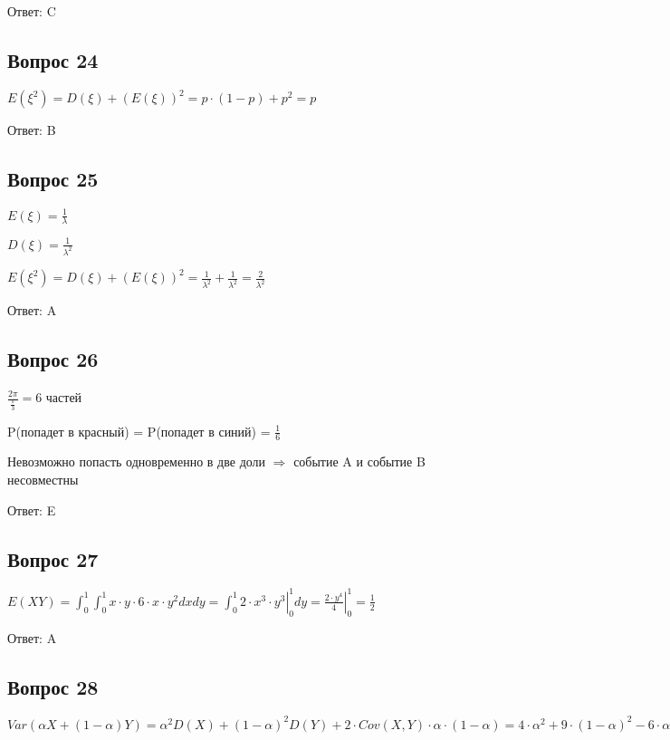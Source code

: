 \documentclass{article}
\begin{document}
\begin{flushleft}
Ответ: C

\subsection{Вопрос 24}

$E(\xi^2) = D(\xi) + (E(\xi))^2 = p\cdot (1-p) + p^2 = p$ 

Ответ: B

\subsection{Вопрос 25}

$E(\xi) = \frac{1}{\lambda}$

$D(\xi) = \frac{1}{\lambda^2}$

$E(\xi^2) = D(\xi) + (E(\xi))^2 = \frac{1}{\lambda^2} + \frac{1}{\lambda^2} = \frac{2}{\lambda^2}$

Ответ: A

\subsection{Вопрос 26}

$\frac{2\pi}{\frac{\pi}{3}} = 6$ частей

P(попадет в красный) = P(попадет в синий) = $\frac{1}{6}$

Невозможно попасть одновременно в две доли $\Rightarrow$ событие A и событие B несовместны

Ответ: E

\subsection{Вопрос 27}

$E(XY) = \int_0^1\int_0^1 x\cdot y \cdot 6 \cdot x \cdot y^2 dxdy = \left.\int_0^1 2\cdot x^3 \cdot y^3 \right|_0^1 dy = \left.\frac{2\cdot y^4}{4}\right|_0^1 = \frac{1}{2}$

Ответ: A

\subsection{Вопрос 28}

$Var(\alpha X + (1-\alpha) Y) = \alpha^2 D(X) + (1-\alpha)^2 D(Y) + 2\cdot Cov(X,Y)\cdot\alpha\cdot(1-\alpha) = 4\cdot\alpha^2 + 9\cdot(1-\alpha)^2 - 6\cdot\alpha\cdot(1-\alpha) = 4\cdot\alpha^2 + 9 - 18\cdot\alpha + 9\cdot\alpha^2 - 6\cdot\alpha + 6\cdot \alpha^2 = 19\cdot\alpha^2 - 24\cdot\alpha + 9$


\end{flushleft}
\end{document}
